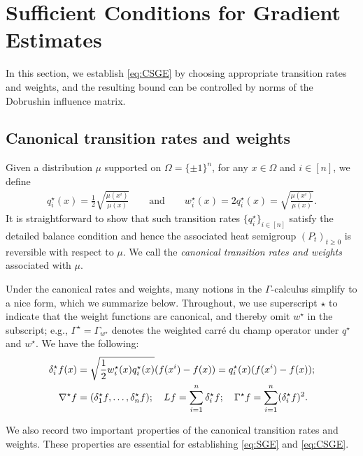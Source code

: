 \section{Sufficient Conditions for Gradient Estimates}


In this section, we establish \ref{eq:CSGE} by choosing appropriate transition rates and weights, and the resulting bound can be controlled by norms of the Dobrushin influence matrix.

\subsection{Canonical transition rates and weights}
Given a distribution $\mu$ supported on $\Omega=\{\pm 1\}^n$, for any $x \in \Omega$ and $i \in [n]$, we define
\begin{align}\label{eq:canonical-r-w}
    q^\star_i(x) = \frac 12\sqrt{\frac{\mu(x^i)}{\mu(x)}}
        \qquad\text{and}\qquad
    w^\star_i(x) = 2q^\star_i(x) = \sqrt{\frac{\mu(x^i)}{\mu(x)}}.
\end{align}
It is straightforward to show that such transition rates $\{q^\star_i\}_{i \in [n]}$ satisfy the detailed balance condition and hence the associated heat semigroup $(P_t)_{t\ge 0}$ is reversible with respect to $\mu$.
We call  the \emph{canonical transition rates and weights} associated with $\mu$. 

Under the canonical rates and weights, many notions in the $\Gamma$-calculus simplify to a nice form, which we summarize below.
Throughout, we use superscript $\star$ to indicate that the weight functions are canonical, and thereby omit $w^\star$ in the subscript; e.g., $\Gamma^\star = \Gamma_{w^\star}$ denotes the weighted carr\'e du champ operator under $q^\star$ and $w^\star$.
We have the following:
\begin{align*}
    \delta^\star_i f(x) &= \sqrt{\frac{1}{2} w^\star_i(x) q^\star_i(x)} (f(x^i) - f(x)) = q^\star_i(x) (f(x^i) - f(x)); \\
    \nabla^\star f &= (\delta^\star_1 f, \dots, \delta^\star_n f); \quad
    L f = \sum_{i=1}^n \delta^\star_i f; \quad
    \Gamma^\star f = \sum_{i=1}^n (\delta^\star_i f)^2.
\end{align*}

We also record two important properties of the canonical transition rates and weights. These properties are essential for establishing \ref{eq:SGE} and \ref{eq:CSGE}.

